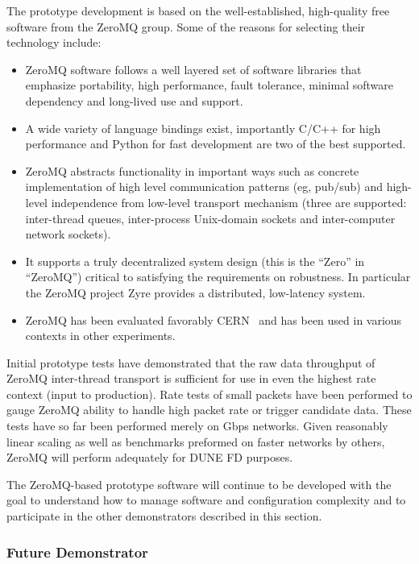The prototype development is based on the well-established, high-quality free software from the ZeroMQ group.
Some of the reasons for selecting their technology include:
\begin{itemize}
\item ZeroMQ software follows a well layered set of software libraries that emphasize portability, high performance, fault tolerance, minimal software dependency and long-lived use and support.
\item A wide variety of language bindings exist, importantly C/C++ for high performance and Python for fast development are two of the best supported.
\item ZeroMQ abstracts functionality in important ways such as concrete implementation of high level communication patterns (eg, pub/sub) and high-level independence from low-level transport mechanism (three are supported: inter-thread queues, inter-process Unix-domain sockets and inter-computer network sockets). 
\item It supports a truly decentralized system design (this is the ``Zero'' in ``ZeroMQ'') critical to satisfying the requirements on robustness.  In particular the ZeroMQ project Zyre provides a distributed, low-latency  system.
\item ZeroMQ has been evaluated favorably CERN~\cite{Dworak:2012mf} and has been used in various  contexts in other experiments.
\end{itemize}

Initial prototype tests have demonstrated that the raw data throughput of ZeroMQ inter-thread transport is sufficient for use in even the highest rate  context (input to  production).
Rate tests of small packets have been performed to gauge ZeroMQ ability to handle high packet rate  or trigger candidate data. 
These tests have so far been performed merely on Gbps networks. 
Given reasonably linear scaling as well as benchmarks preformed on faster networks by others, ZeroMQ will perform adequately for DUNE FD  purposes.

The ZeroMQ-based prototype software will continue to be developed with the goal to understand how to manage software and configuration complexity and to participate in the other demonstrators described in this section. 


\subsubsection{Future   Demonstrator}
\label{sec:sp-daq:validation-pd-demonstrator}

